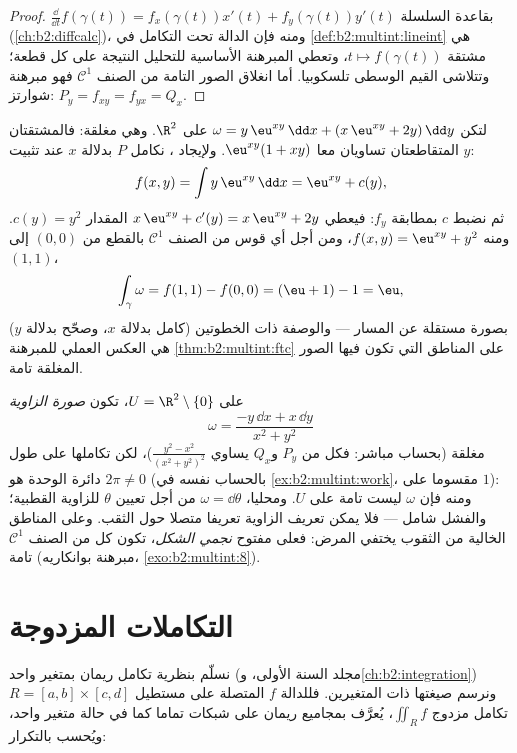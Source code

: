 \begin{proof}
$\frac{\dd}{\dd t}f(\gamma(t)) = f_x(\gamma(t))x'(t) +
f_y(\gamma(t))y'(t)$ بقاعدة السلسلة (\cref{ch:b2:diffcalc})، ومنه فإن الدالة تحت التكامل في \cref{def:b2:multint:lineint}
هي مشتقة $t \mapsto
f(\gamma(t))$، وتعطي المبرهنة الأساسية للتحليل النتيجة على كل قطعة؛
وتتلاشى القيم الوسطى تلسكوبيا. أما انغلاق الصور التامة من الصنف
$\mathcal{C}^1$ فهو مبرهنة شوارتز: $P_y =
f_{xy} = f_{yx} = Q_x$.
\end{proof}

\begin{example}\label{ex:b2:multint:potential}
لتكن $\omega = y\,\eu^{xy}\,\dd x + (x\,\eu^{xy} + 2y)\,\dd y$ على $\R^2$. وهي مغلقة: فالمشتقتان المتقاطعتان تساويان
معا $\eu^{xy}(1 + xy)$. ولإيجاد ، نكامل $P$ بدلالة $x$ عند تثبيت $y$:
\[
f(x, y) = \int y\,\eu^{xy}\,\dd x = \eu^{xy} + c(y),
\]
ثم نضبط $c$ بمطابقة $f_y$: فيعطي $x\,\eu^{xy} + c'(y) =
x\,\eu^{xy} + 2y$ المقدار $c(y) = y^2$. ومنه
$f(x,y) = \eu^{xy} +
y^2$، ومن أجل أي قوس من الصنف $\mathcal C^1$ بالقطع من $(0,0)$ إلى $(1,1)$،
\[
\int_\gamma\omega = f(1,1) - f(0,0) = (\eu + 1) - 1 = \eu ,
\]
بصورة مستقلة عن المسار --- والوصفة ذات الخطوتين (كامل بدلالة $x$،
وصحّح بدلالة $y$) هي العكس العملي للمبرهنة \cref{thm:b2:multint:ftc} على المناطق
التي تكون فيها الصور المغلقة تامة.
\end{example}

\begin{example}\label{ex:b2:multint:angleform}
على $U = \R^2 \setminus \{0\}$، تكون \emph{صورة الزاوية}
\[
\omega = \frac{-y\,\dd x + x\,\dd y}{x^2 + y^2}
\]
مغلقة (بحساب مباشر: فكل من $P_y$ و$Q_x$ يساوي $\frac{y^2 - x^2}{(x^2+y^2)^2}$)، لكن
تكاملها على طول دائرة الوحدة هو $2\pi \neq 0$ (بالحساب نفسه في \cref{ex:b2:multint:work}،
مقسوما على $1$): ومنه فإن $\omega$ ليست تامة على $U$. ومحليا،
$\omega = \dd\theta$ من أجل تعيين $\theta$ للزاوية القطبية؛ والفشل شامل --- فلا
يمكن تعريف الزاوية تعريفا متصلا حول الثقب. وعلى المناطق الخالية من
الثقوب يختفي المرض: فعلى مفتوح \emph{نجمي الشكل}، تكون كل 
من الصنف $\mathcal{C}^1$ تامة (مبرهنة بوانكاريه، \cref{exo:b2:multint:8}).
\end{example}

\section{التكاملات المزدوجة}

نسلّم بنظرية تكامل ريمان بمتغير واحد (مجلد السنة الأولى، و\cref{ch:b2:integration})
ونرسم صيغتها ذات المتغيرين. فللدالة $f$ المتصلة على مستطيل
$R = [a, b] \times [c, d]$ تكامل مزدوج $\iint_R f$، يُعرَّف بمجاميع ريمان على شبكات تماما كما
في حالة متغير واحد، ويُحسب بالتكرار:

